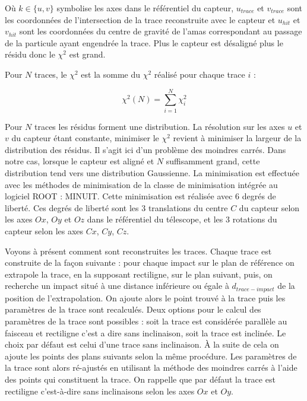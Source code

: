      O\`u $k \in \{u,v\}$ symbolise les axes dans le r\'ef\'erentiel du capteur, $u_{trace}$ et $v_{trace}$ sont les coordonn\'ees de l'intersection de la trace reconstruite avec le capteur et $u_{hit}$ et $v_{hit}$ sont les coordonn\'ees du centre de gravit\'e de l'amas correspondant au passage de la particule ayant engendr\'ee la trace. Plus le capteur est d\'esalign\'e plus le r\'esidu donc le $\chi^2$ est grand.
     
     \medskip
     
     Pour $N$ traces, le $\chi^2$ est la somme du $\chi^2$ r\'ealis\'e pour chaque trace $i$ : 
     
     \begin{equation}
       \chi^2(N) = \sum_{i=1}^N \chi^2_i
     \end{equation}
     
     Pour $N$ traces les r\'esidus forment une distribution. La r\'esolution sur les axes $u$ et $v$ du capteur \'etant constante, minimiser le $\chi^2$ revient \`a minimiser la largeur de la distribution des r\'esidus. Il s'agit ici d'un probl\`eme des moindres carr\'es. Dans notre cas, lorsque le capteur est align\'e et $N$ suffisamment grand, cette distribution tend vers une distribution Gaussienne. La minimisation est effectu\'ee avec les m\'ethodes de minimisation de la classe de minimisation int\'egr\'ee au logiciel ROOT : MINUIT. Cette minimisation est r\'ealis\'ee avec 6 degr\'es de libert\'e. Ces degr\'es de libert\'e sont les 3 translations du centre $C$ du capteur selon les axes $Ox$, $Oy$ et $Oz$ dans le r\'ef\'erentiel du t\'elescope, et les 3 rotations du capteur selon les axes $Cx$, $Cy$, $Cz$.
     
     \medskip
     Voyons \`a pr\'esent comment sont reconstruites les traces. Chaque trace est construite de la fa\c{c}on suivante : pour chaque impact sur le plan de r\'ef\'erence on extrapole la trace, en la supposant rectiligne, sur le plan suivant, puis, on recherche un impact situ\'e \`a une distance inf\'erieure ou \'egale \`a $d_{trace-impact}$ de la position de l'extrapolation. On ajoute alors le point trouv\'e \`a la trace puis les param\`etres de la trace sont recalcul\'es. Deux options pour le calcul des param\`etres de la trace sont possibles : soit la trace est consid\'er\'ee parall\`ele au faisceau et rectiligne c'est a dire sans inclinaison, soit la trace est inclin\'ee. Le choix par défaut est celui d'une trace sans inclinaison. \`A la suite de cela on ajoute les points des plans suivants selon la m\^eme proc\'edure. Les param\`etres de la trace sont alors r\'e-ajust\'es en utilisant la m\'ethode des moindres carr\'es \`a l'aide des points qui constituent la trace. On rappelle que par défaut la trace est rectiligne c'est-\`a-dire sans inclinaisons selon les axes $Ox$ et $Oy$.
     
